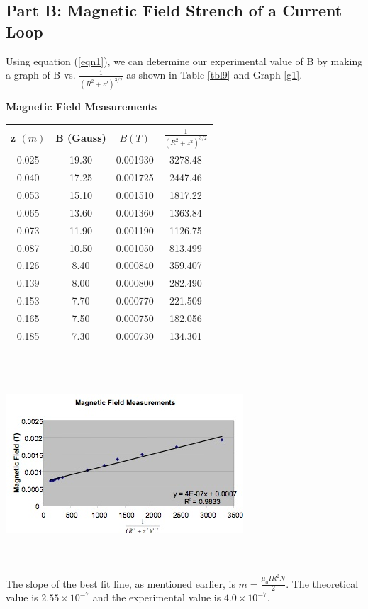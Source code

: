 \documentclass[titlepage]{article}
\begin{document}
\subsection{Part B: Magnetic Field Strench of a Current Loop}\label{sub:part_b_magnetic_field_strench_of_a_current_loop-anl}
Using equation (\ref{eqn1}), we can determine our experimental value of B by making a graph of B vs. $\frac{1}{(R^2 + z^2)^{3/2}}$ as shown in Table \ref{tbl9} and Graph \ref{g1}.

\begin{center}\label{tbl9}
	\textbf{Magnetic Field Measurements}\\
	\begin{tabular}{cccc}
	\hline
	z $(m)$ & B (Gauss) & $B(T)$ & $\frac{1}{(R^2 + z^2)^{3/2}}$\\
	\hline
	0.025 & 19.30 & 0.001930 & 3278.48\\
	\hline
	0.040 & 17.25 & 0.001725 & 2447.46\\
	\hline
	0.053 & 15.10 & 0.001510 & 1817.22\\
	\hline
	0.065 & 13.60 & 0.001360 & 1363.84\\
	\hline
	0.073 & 11.90 & 0.001190 & 1126.75\\
	\hline
	0.087 & 10.50 & 0.001050 & 813.499\\
	\hline
	0.126 & 8.40 & 0.000840 & 359.407\\
	\hline
	0.139 & 8.00 & 0.000800 & 282.490\\
	\hline
	0.153 & 7.70 & 0.000770 & 221.509\\
	\hline
	0.165 & 7.50 & 0.000750 & 182.056\\
	\hline
	0.185 & 7.30 & 0.000730 & 134.301\\
	\hline
	\end{tabular}
\end{center}\\
\\
\begin{center}\label{g1}
	\includegraphics{1.jpg}
\end{center}\\
\\
The slope of the best fit line, as mentioned earlier, is $m = \frac{\mu_0 IR^2 N}{2}$. The theoretical value is $2.55 \times 10^{-7}$ and the experimental value is $4.0 \times 10^{-7}$.
\end{document}
